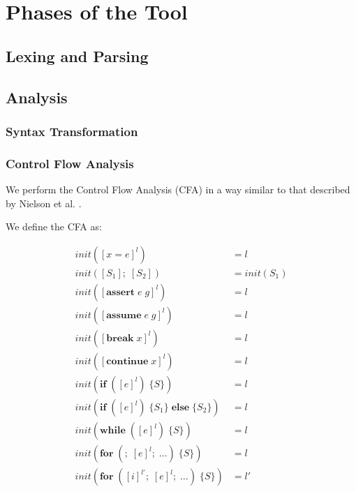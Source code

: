\chapter{Phases of the Tool}

\section{Lexing and Parsing}

\section{Analysis}

\subsection{Syntax Transformation}

\subsection{Control Flow Analysis}
We perform the Control Flow Analysis (CFA) in a way similar to that described by
Nielson et al. \cite{nielson2015principles}.

We define the CFA as:

\begin{align*}
    init([x = e]^l)                                             &= l          \\
    init([S_1];\;[S_2])                                         &= init(S_1)  \\
    init([\textbf{assert}\;e\;g]^l)                             &= l          \\
    init([\textbf{assume}\;e\;g]^l)                             &= l          \\
    init([\textbf{break}\;x]^l)                                 &= l          \\
    init([\textbf{continue}\;x]^l)                              &= l          \\
    init(\textbf{if}\;([e]^l)\;\{S\})                           &= l          \\
    init(\textbf{if}\;([e]^l)\;\{S_1\}\;\textbf{else}\;\{S_2\}) &= l          \\
    init(\textbf{while}\;([e]^l)\;\{S\})                        &= l          \\
    init(\textbf{for}\;(;\;[e]^l;\;\dots)\;\{S\})               &= l          \\
    init(\textbf{for}\;([i]^{l'};\;[e]^l;\;\dots)\;\{S\})       &= l'
\end{align*}

